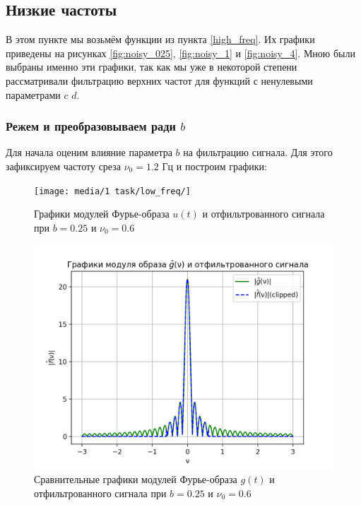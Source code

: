 \subsection{Низкие частоты}

В этом пункте мы возьмём функции из пункта \ref{high_freq}. Их графики приведены на рисунках \ref{fig:noisy_025}, \ref{fig:noisy_1} и \ref{fig:noisy_4}. Мною были выбраны именно эти графики, так как мы уже в некоторой степени рассматривали фильтрацию верхних частот для функций с ненулевыми параметрами $c$ $d$.

\subsubsection{Режем и преобразовываем ради $b$}
Для начала оценим влияние параметра $b$ на фильтрацию сигнала. Для этого зафиксируем частоту среза $\nu_0=1.2$ Гц и построим графики:

\begin{figure}[ht!]
    \centering
    \texttt{[image: media/1 task/low\_freq/]}
    \caption{Графики модулей Фурье-образа $u(t)$ и отфильтрованного сигнала при $b=0.25$ и $\nu_0=0.6$}
    \label{fig:four_025_06}
\end{figure}

\begin{figure}[ht!]
    \centering
    \includegraphics[scale=0.55]{media/1 task/high_freq/Fourier_Image_Comparison_0,25_-0,5975975975975976.png}
    \caption{Сравнительные графики модулей Фурье-образа $g(t)$ и отфильтрованного сигнала при $b=0.25$ и $\nu_0=0.6$}
    \label{fig:fourc_025_06}
\end{figure}

